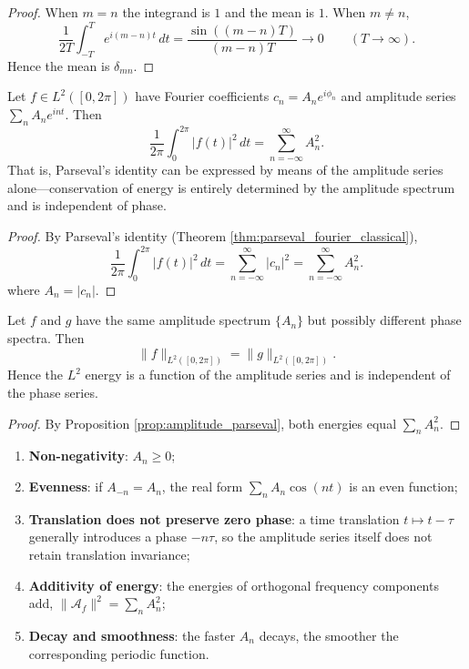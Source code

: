 \begin{proof}
When $m=n$ the integrand is $1$ and the mean is $1$. When $m\neq n$,
\[
\frac{1}{2T}\int_{-T}^{T} e^{i(m-n)t}\,dt
= \frac{\sin((m-n)T)}{(m-n)T} \to 0 \qquad (T\to\infty).
\]
Hence the mean is $\delta_{mn}$.
\end{proof}

\begin{proposition}\label{prop:amplitude_parseval}
Let $f \in L^2([0,2\pi])$ have Fourier coefficients $c_n=A_n e^{i\phi_n}$ and amplitude series $\sum_n A_n e^{int}$. Then
\[
\frac{1}{2\pi}\int_0^{2\pi} |f(t)|^2\,dt
= \sum_{n=-\infty}^{\infty} A_n^2.
\]
That is, Parseval's identity can be expressed by means of the amplitude series alone---conservation of energy is entirely determined by the amplitude spectrum and is independent of phase.
\end{proposition}

\begin{proof}
By Parseval's identity (Theorem \ref{thm:parseval_fourier_classical}),
\[
\frac{1}{2\pi}\int_0^{2\pi} |f(t)|^2\,dt
= \sum_{n=-\infty}^{\infty} |c_n|^2
= \sum_{n=-\infty}^{\infty} A_n^2.
\]
where $A_n=|c_n|$.
\end{proof}

\begin{corollary}\label{cor:amplitude_energy_only}
Let $f$ and $g$ have the same amplitude spectrum $\{A_n\}$ but possibly different phase spectra. Then
\[
\|f\|_{L^2([0,2\pi])} = \|g\|_{L^2([0,2\pi])}.
\]
Hence the $L^2$ energy is a function of the amplitude series and is independent of the phase series.
\end{corollary}

\begin{proof}
By Proposition \ref{prop:amplitude_parseval}, both energies equal $\sum_n A_n^2$.
\end{proof}

\begin{property}\label{prop:amplitude_series_properties}
\begin{enumerate}[label=(\roman*)]
    \item \textbf{Non-negativity}: $A_n\ge 0$;
    \item \textbf{Evenness}: if $A_{-n}=A_n$, the real form $\sum_n A_n\cos(nt)$ is an even function;
    \item \textbf{Translation does not preserve zero phase}: a time translation $t\mapsto t-\tau$ generally introduces a phase $-n\tau$, so the amplitude series itself does not retain translation invariance;
    \item \textbf{Additivity of energy}: the energies of orthogonal frequency components add, $\|\mathcal{A}_f\|^2=\sum_n A_n^2$;
    \item \textbf{Decay and smoothness}: the faster $A_n$ decays, the smoother the corresponding periodic function.
\end{enumerate}
\end{property}

